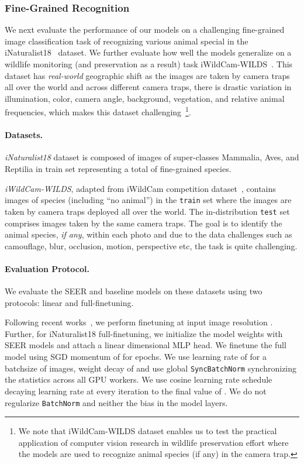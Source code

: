 \documentclass[10pt,twocolumn,letterpaper]{article}
\newcommand{\inat}{iNaturalist18\xspace}
\newcommand{\iwild}{iWildCam-WILDS\xspace}
\newcommand{\syncbn}{\texttt{SyncBatchNorm}\xspace}
\newcommand{\batchnorm}{\texttt{BatchNorm}\xspace}
\begin{document}
\subsubsection{Fine-Grained Recognition}
\label{sec:inat_section}
We next evaluate the performance of our models on a challenging fine-grained image classification task of recognizing various animal special in the \inat~\cite{vanhorn2018inaturalist} dataset. We further evaluate how well the models generalize on a wildlife monitoring (and preservation as a result) task \iwild~\cite{koh2021wilds}. This dataset has \textit{real-world} geographic shift as the images are taken by camera traps all over the world and across different camera traps, there is drastic variation in illumination, color, camera angle, background, vegetation, and relative animal frequencies, which makes this dataset challenging~\footnote{We note that \iwild dataset enables us to test the practical application of computer vision research in wildlife preservation effort where the models are used to recognize animal species (if any) in the camera trap.}.

\paragraph{Datasets.}
\textit{\inat} dataset is composed of  images of super-classes Mammalia, Aves, and Reptilia in train set representing a total of  fine-grained species. 

\textit{\iwild}, adapted from iWildCam  competition dataset~\cite{beery2020iwildcam}, contains  images of  species (including ``no animal'') in the \texttt{train} set where the images are taken by  camera traps deployed all over the world. The in-distribution \texttt{test} set comprises  images taken by the same  camera traps. The goal is to identify the animal species, \textit{if any}, within each photo and due to the data challenges such as camouflage, blur, occlusion, motion, perspective etc, the task is quite challenging.


\paragraph{Evaluation Protocol.} We evaluate the SEER and baseline models on these datasets using two protocols: linear and full-finetuning.

Following recent works~\cite{dosovitskiy2021image}, we perform finetuning at input image resolution . Further, for \inat full-finetuning, we initialize the model weights with SEER models and attach a linear  dimensional MLP head. We finetune the full model using SGD momentum of  for  epochs. We use learning rate of  for a batchsize of  images, weight decay of  and use global \syncbn synchronizing the statistics across all GPU workers. We use cosine learning rate schedule decaying learning rate at every iteration to the final value of . We do not regularize \batchnorm and neither the bias in the model layers.
\end{document}
